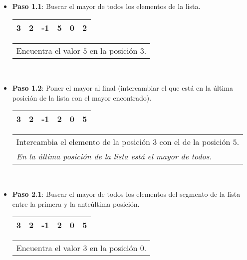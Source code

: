 \begin{itemize}

\item {\bf Paso 1.1}: Buscar el mayor de todos los elementos de la lista.
\\

\hspace{0.75cm}
\begin{tabular}[c]{|c|c|c|c|c|c|}
\hline
3& 2&-1&5&0&2\\
\hline
\end{tabular}
\hspace{0.75cm}
\begin{tabular}{p{9cm}}
Encuentra el valor $5$ en la posición $3$.
\end{tabular}\\

\item {\bf Paso 1.2}: Poner el mayor al final (intercambiar el que está en la última
posición de la lista con el mayor encontrado).\\

\hspace{0.75cm}
\begin{tabular}[c]{|c|c|c|c|c|c|}
\hline
3& 2&-1&2&0&5\\
\hline
\end{tabular}
\hspace{0.75cm}
\begin{tabular}{p{9cm}}
Intercambia el elemento de la posición $3$ con el de la posición $5$. \\
{\it En la última posición de la lista está el mayor de todos.}
\end{tabular} \\

\item {\bf Paso 2.1}: Buscar el mayor de todos los elementos del segmento de la lista
entre la primera y la anteúltima posición. \\

\hspace{0.75cm}
\begin{tabular}[c]{|c|c|c|c|c|c|}
\hline
3& 2&-1&2&0&5\\
\hline
\end{tabular}
\hspace{0.75cm}
\begin{tabular}{p{9cm}}
Encuentra el valor $3$ en la posición $0$.
\end{tabular} \\


\end{itemize}
